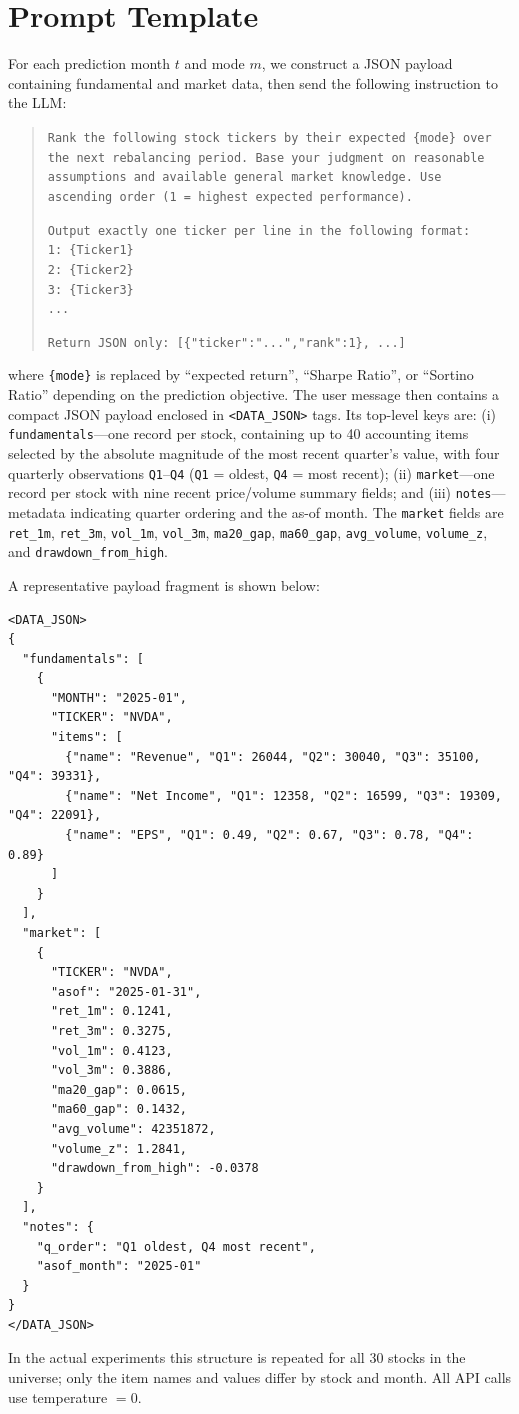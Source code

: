 \section{Prompt Template}
\label{app:prompt}

For each prediction month $t$ and mode $m$, we construct a JSON payload containing fundamental and market data, then send the following instruction to the LLM:

\begin{quote}
\small
\texttt{Rank the following stock tickers by their expected \{mode\} over the next rebalancing period.
Base your judgment on reasonable assumptions and available general market knowledge.
Use ascending order (1 = highest expected performance).}

\texttt{Output exactly one ticker per line in the following format:}\\
\texttt{1: \{Ticker1\}}\\
\texttt{2: \{Ticker2\}}\\
\texttt{3: \{Ticker3\}}\\
\texttt{...}

\texttt{Return JSON only: [\{"ticker":"...","rank":1\}, ...]}
\end{quote}

\noindent where \texttt{\{mode\}} is replaced by ``expected return'', ``Sharpe Ratio'', or ``Sortino Ratio'' depending on the prediction objective.
The user message then contains a compact JSON payload enclosed in \texttt{<DATA\_JSON>} tags. Its top-level keys are:
(i) \texttt{fundamentals}---one record per stock, containing up to 40 accounting items selected by the absolute magnitude of the most recent quarter's value, with four quarterly observations \texttt{Q1}--\texttt{Q4} (\texttt{Q1} = oldest, \texttt{Q4} = most recent);
(ii) \texttt{market}---one record per stock with nine recent price/volume summary fields; and
(iii) \texttt{notes}---metadata indicating quarter ordering and the as-of month.
The \texttt{market} fields are \texttt{ret\_1m}, \texttt{ret\_3m}, \texttt{vol\_1m}, \texttt{vol\_3m}, \texttt{ma20\_gap}, \texttt{ma60\_gap}, \texttt{avg\_volume}, \texttt{volume\_z}, and \texttt{drawdown\_from\_high}.

\noindent A representative payload fragment is shown below:

\begin{verbatim}
<DATA_JSON>
{
  "fundamentals": [
    {
      "MONTH": "2025-01",
      "TICKER": "NVDA",
      "items": [
        {"name": "Revenue", "Q1": 26044, "Q2": 30040, "Q3": 35100, "Q4": 39331},
        {"name": "Net Income", "Q1": 12358, "Q2": 16599, "Q3": 19309, "Q4": 22091},
        {"name": "EPS", "Q1": 0.49, "Q2": 0.67, "Q3": 0.78, "Q4": 0.89}
      ]
    }
  ],
  "market": [
    {
      "TICKER": "NVDA",
      "asof": "2025-01-31",
      "ret_1m": 0.1241,
      "ret_3m": 0.3275,
      "vol_1m": 0.4123,
      "vol_3m": 0.3886,
      "ma20_gap": 0.0615,
      "ma60_gap": 0.1432,
      "avg_volume": 42351872,
      "volume_z": 1.2841,
      "drawdown_from_high": -0.0378
    }
  ],
  "notes": {
    "q_order": "Q1 oldest, Q4 most recent",
    "asof_month": "2025-01"
  }
}
</DATA_JSON>
\end{verbatim}

In the actual experiments this structure is repeated for all 30 stocks in the universe; only the item names and values differ by stock and month.
All API calls use temperature $= 0$.

\clearpage
